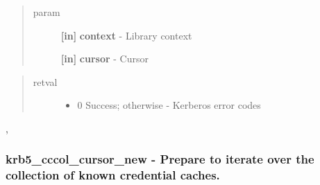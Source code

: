 \documentclass[letterpaper,10pt,english]{sphinxmanual}
\begin{document}
\begin{quote}\begin{description}
\item[{param}] \leavevmode
\textbf{{[}in{]}} \textbf{context} - Library context

\textbf{{[}in{]}} \textbf{cursor} - Cursor

\end{description}\end{quote}
\begin{quote}\begin{description}
\item[{retval}] \leavevmode\begin{itemize}
\item {} 
0   Success; otherwise - Kerberos error codes

\end{itemize}

\end{description}\end{quote}




{\hyperref[appdev/refs/api/krb5_cccol_cursor_new:c.krb5_cccol_cursor_new]{}} , {\hyperref[appdev/refs/api/krb5_cccol_cursor_next:c.krb5_cccol_cursor_next]{}}




\subsubsection{krb5\_cccol\_cursor\_new -  Prepare to iterate over the collection of known credential caches.}
\label{appdev/refs/api/krb5_cccol_cursor_new::doc}\label{appdev/refs/api/krb5_cccol_cursor_new:krb5-cccol-cursor-new-prepare-to-iterate-over-the-collection-of-known-credential-caches}

\begin{fulllineitems}
\label{appdev/refs/api/krb5_cccol_cursor_new:c.krb5_cccol_cursor_new}
\end{fulllineitems}
\end{document}

